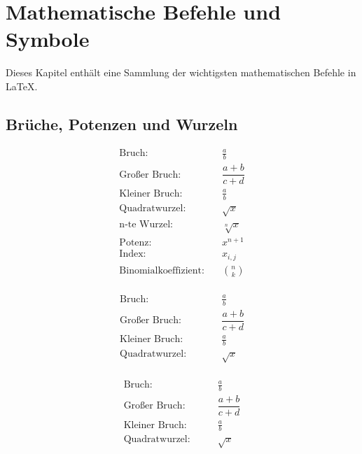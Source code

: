 \documentclass[11pt,a4paper]{scrartcl}
\begin{document}
	
	\section{Mathematische Befehle und Symbole}
	\label{sec:mathematische-befehle}
	
	Dieses Kapitel enthält eine Sammlung der wichtigsten
	mathematischen Befehle in LaTeX.
	
	\subsection{Brüche, Potenzen und Wurzeln}
	
	\begin{align}
		\text{Bruch:}\quad %
		&\frac{a}{b} \\[4pt]
		\text{Großer Bruch:}\quad
		&\dfrac{a+b}{c+d} \\[4pt]
		\text{Kleiner Bruch:}\quad
		&\tfrac{a}{b} \\[4pt]
		\text{Quadratwurzel:}\quad
		&\sqrt{x} \\[4pt]
		\text{n-te Wurzel:}\quad
		&\sqrt[n]{x} \\[4pt]
		\text{Potenz:}\quad
		&x^{n+1} \\[4pt]
		\text{Index:}\quad
		&x_{i,j} \\[4pt]
		\text{Binomialkoeffizient:}\quad
		&\binom{n}{k}
	\end{align}
\\


	
	\[ %
	\begin{alignedat}{2}
		\text{Bruch:}          &\qquad& \frac{a}{b} \\
		\text{Großer Bruch:}   &      & \dfrac{a+b}{c+d} \\
		\text{Kleiner Bruch:}  &      & \tfrac{a}{b} \\
		\text{Quadratwurzel:} &      & \sqrt{x}
	\end{alignedat}
	\]
\\

	
	\begin{equation} %
		\begin{alignedat}{1}
			\text{Bruch:}\qquad          & \frac{a}{b} \\
			\text{Großer Bruch:}\qquad   & \dfrac{a+b}{c+d} \\
			\text{Kleiner Bruch:}\qquad  & \tfrac{a}{b} \\
			\text{Quadratwurzel:}\qquad & \sqrt{x}
		\end{alignedat}
		\label{eq:formelsammlung}
	\end{equation}
\\
	
\end{document}
